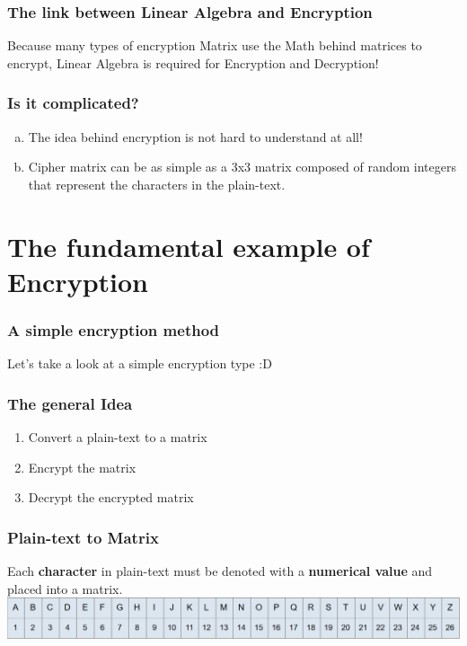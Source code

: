 \documentclass[11pt]{beamer}
\begin{document}
\begin{frame}\frametitle{The link between Linear Algebra and Encryption}

Because many types of encryption Matrix use the Math behind matrices to encrypt, Linear Algebra is required for Encryption and Decryption!

\end{frame}

\begin{frame}\frametitle{Is it complicated?}
\begin{enumerate}[a.]
	\item The idea behind encryption is not hard to understand at all! 
	\item Cipher matrix can be as simple as a 3x3 matrix composed of random 	integers that represent the characters in the plain-text.
\end{enumerate}

\end{frame}

\section{The fundamental example of Encryption}
\begin{frame}\frametitle{A simple encryption method}
\center Let's take a look at a simple encryption type :D
\end{frame}

\begin{frame}\frametitle{The general Idea}
\begin{enumerate}[1]
	\item Convert a plain-text to a matrix
	\item Encrypt the matrix
	\item Decrypt the encrypted matrix
\end{enumerate}
\end{frame}

\begin{frame}\frametitle{Plain-text to Matrix}

Each \textbf{character} in plain-text must be denoted with a \textbf{numerical value} and placed into a matrix.
\center \includegraphics[scale=0.275]{numerical}
\end{frame}
\end{document}
